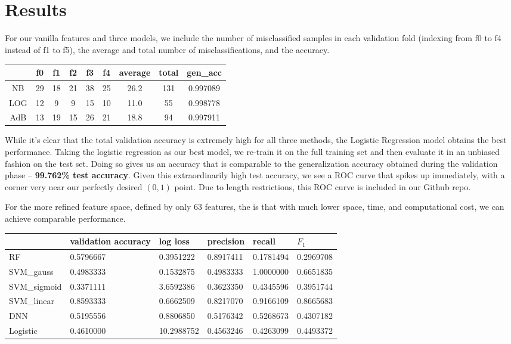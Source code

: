 \documentclass{article} %
\begin{document}
\section{Results}
For our vanilla features and three models, we include the number of misclassified samples in each validation fold (indexing from f0 to f4 instead of f1 to f5), the average and total number of misclassifications, and the accuracy.
\begin{table}[h]
\centering
\small
\begin{tabular}{|c|c|c|c|c|c|c|c|c|}
\hline
    & f0 & f1 & f2 & f3 & f4 & average & total & gen\_acc \\ \hline
NB  & 29 & 18 & 21 & 38 & 25 & 26.2    & 131   & 0.997089 \\ \hline
LOG & 12 & 9  & 9  & 15 & 10 & 11.0    & 55    & 0.998778 \\ \hline
AdB & 13 & 19 & 15 & 26 & 21 & 18.8    & 94    & 0.997911 \\ \hline
\end{tabular}
\end{table}
While it's clear that the total validation accuracy is extremely high for all three methods, the Logistic Regression model obtains the best performance.  Taking the logistic regression as our best model, we re-train it on the full training set and then evaluate it in an unbiased fashion on the test set.  Doing so gives us an accuracy that is comparable to the generalization accuracy obtained during the validation phase -- \textbf{99.762\% test accuracy}.  Given this extraordinarily high test accuracy, we see a ROC curve that spikes up immediately, with a corner very near our perfectly desired $(0, 1)$ point.  Due to length restrictions, this ROC curve is included in our Github repo.\par 
For the more refined feature space, defined by only 63 features, the is that with much lower space, time, and computational cost, we can achieve comparable performance.
\begin{table}[H]
\small
\centering
\begin{tabular}{|l|l|l|l|l|l|}
\hline
             & validation accuracy & log loss   & precision & recall    & $F_1$     \\ \hline
RF           & 0.5796667           & 0.3951222  & 0.8917411 & 0.1781494 & 0.2969708 \\ \hline
SVM\_gauss   & 0.4983333           & 0.1532875  & 0.4983333 & 1.0000000 & 0.6651835 \\ \hline
SVM\_sigmoid & 0.3371111           & 3.6592386  & 0.3623350 & 0.4345596 & 0.3951744 \\ \hline
SVM\_linear  & 0.8593333           & 0.6662509  & 0.8217070 & 0.9166109 & 0.8665683 \\ \hline
DNN          & 0.5195556           & 0.8806850  & 0.5176342 & 0.5268673 & 0.4307182 \\ \hline
Logistic     & 0.4610000           & 10.2988752 & 0.4563246 & 0.4263099 & 0.4493372 \\ \hline
\end{tabular}
\end{table}
\end{document}
